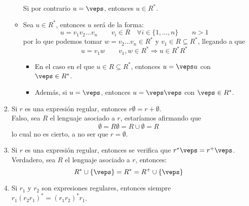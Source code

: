 \begin{enumerate}
\begin{itemize}
                Si por contrario $u = \veps$, entonces $u\in R^\ast$.
            \item Sea $u\in R^\ast$, entonces $u$ será de la forma:
                \begin{equation*}
                    u = v_1v_2\ldots v_n \qquad v_i \in R \quad \forall i \in \{1,\ldots, n\} \qquad n > 1
                \end{equation*}
                por lo que podemos tomar $w = v_2\ldots v_n \in R^\ast$ y $v_1\in R \subseteq R^\ast$, llegando a que
                \begin{equation*}
                    u = v_1w \qquad v_1,w \in R^\ast \Longrightarrow u\in R^\ast R^\ast
                \end{equation*}
                \begin{itemize}
                    \item En el caso en el que $u\in R\subseteq R^\ast$, entonces $u = \veps u$ con $\veps \in R^\ast$.
                    \item Además, si $u = \veps$, entonces $u = \veps \veps$ con $\veps \in R^\ast$.
                \end{itemize}
        \end{itemize}
    \item Si $r$ es una expresión regular, entonces $r\emptyset =r+\emptyset $.\\

        Falso, sea $R$ el lenguaje asociado a $r$, estaríamos afirmando que
        \begin{equation*}
            \emptyset  = R\emptyset  = R \cup \emptyset  = R
        \end{equation*}
        lo cual no es cierto, a no ser que $r = \emptyset $.
    \item Si $r$ es una expresión regular, entonces se verifica que $r^\ast\veps =r^+\veps$.\\

        Verdadero, sea $R$ el lenguaje asociado a $r$, entonces:
        \begin{equation*}
            R^\ast \cup \{\veps\} = R^\ast = R^+ \cup \{\veps\}
        \end{equation*}
    \item \label{item:preg13}
    Si $r_1$ y $r_2$ son expresiones regulares, entonces siempre $r_1{(r_2r_1)}^{\ast}={(r_1r_2)}^{\ast}r_1$.\\


\end{enumerate}
